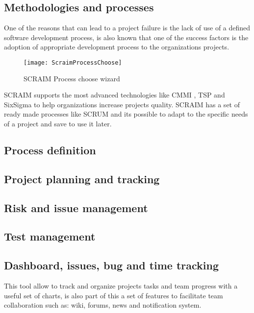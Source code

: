 \subsection{Methodologies and processes}
One of the reasons that can lead to a project failure is the lack of use of a defined software development process, is also known that one of the success factors is the adoption of appropriate development process to the organizations projects.

\begin{figure}[h]
	\begin{center}
		\leavevmode
		\texttt{[image: ScraimProcessChoose]}
		\caption{SCRAIM Process choose wizard}
		\label{fig:scraimrocesschoose}
	\end{center}
\end{figure}

SCRAIM supports the most advanced technologies like CMMI \citep{Development2010}, TSP and SixSigma \citep{SixSigmaWeb} to help organizations increase projects quality.
SCRAIM has a set of ready made processes like SCRUM \citep{Pries2011} and its possible to adapt to the specific needs of a project and save to use it later.

\subsection{Process definition}
\subsection{Project planning and tracking}
\subsection{Risk and issue management}
\subsection{Test management}




\subsection{Dashboard, issues, bug and time tracking}
This tool allow to track and organize projects tasks and team progress with a useful set of charts, is also part of this a set of features to facilitate team collaboration such as: wiki, forums, news and notification system.

